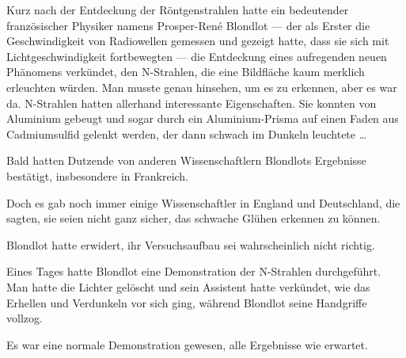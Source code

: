 Kurz nach der Entdeckung der Röntgenstrahlen hatte ein bedeutender französischer Physiker namens Prosper-René Blondlot — der als Erster die Geschwindigkeit von Radiowellen gemessen und gezeigt hatte, dass sie sich mit Lichtgeschwindigkeit fortbewegten — die Entdeckung eines aufregenden neuen Phänomens verkündet, den N-Strahlen, die eine Bildfläche kaum merklich erleuchten würden. Man musste genau hinsehen, um es zu erkennen, aber es war da. N-Strahlen hatten allerhand interessante Eigenschaften. Sie konnten von Aluminium gebeugt und sogar durch ein Aluminium-Prisma auf einen Faden aus Cadmiumsulfid gelenkt werden, der dann schwach im Dunkeln leuchtete …

Bald hatten Dutzende von anderen Wissenschaftlern Blondlots Ergebnisse bestätigt, insbesondere in Frankreich.

Doch es gab noch immer einige Wissenschaftler in England und Deutschland, die sagten, sie seien nicht ganz sicher, das schwache Glühen erkennen zu können.

Blondlot hatte erwidert, ihr Versuchsaufbau sei wahrscheinlich nicht richtig.

Eines Tages hatte Blondlot eine Demonstration der N-Strahlen durchgeführt. Man hatte die Lichter gelöscht und sein Assistent hatte verkündet, wie das Erhellen und Verdunkeln vor sich ging, während Blondlot seine Handgriffe vollzog.

Es war eine normale Demonstration gewesen, alle Ergebnisse wie erwartet.

